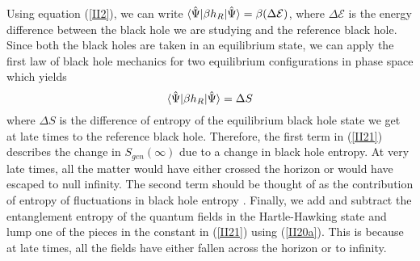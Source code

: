 \documentclass[12pt]{article}
\DeclarePairedDelimiter\bra{\langle}{\rvert}
\DeclarePairedDelimiter\ket{\lvert}{\rangle}
\begin{document}
 Using equation (\ref{II2}), we can write $\bra{\hat{\Psi}}\beta h_{R}\ket{\hat{\Psi}}= \beta(\Delta\mathcal{E}) $, where $\Delta\mathcal{E}$ is the energy difference between the black hole we are studying and the reference black hole. Since both the black holes are taken in an equilibrium state, we can apply the first law of black hole mechanics for two equilibrium configurations in phase space which yields
 \begin{equation}\label{II22}
 \bra{\hat{\Psi}}\beta h_{R}\ket{\hat{\Psi}}= \Delta S
 \end{equation}
  where $\Delta S$ is the difference of entropy of the equilibrium black hole state we get at late times to the reference black hole. Therefore, the first term in (\ref{II21}) describes the change in  $S_{gen}(\infty)$ due to a change in black hole entropy. At very late times, all the matter would have either crossed the horizon or would have escaped to null infinity. The second term should be thought of as the contribution of entropy of fluctuations in black hole entropy \cite{VGE}. Finally, we add and subtract the entanglement entropy of the quantum fields in the Hartle-Hawking state and lump one of the pieces in the constant in (\ref{II21}) using (\ref{II20a}). This is because at late times, all the fields have either fallen across the horizon or to infinity.
\end{document}
